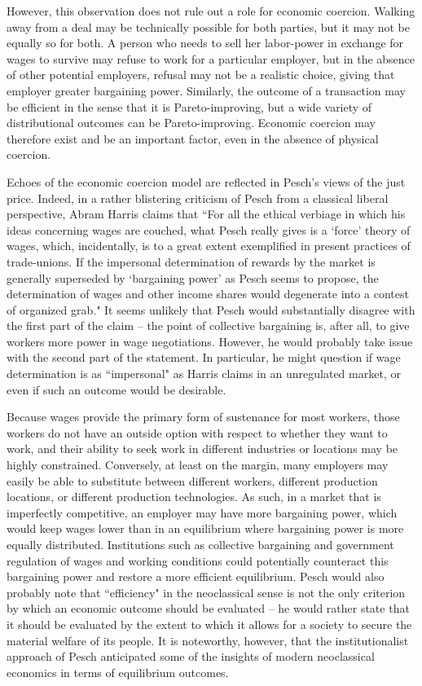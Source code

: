 \documentclass{article}
\begin{document}
However, this observation does not rule out a role for economic coercion.  Walking away from a deal may be technically possible for both parties, but it may not be equally so for both.  A person who needs to sell her labor-power in exchange for wages to survive may refuse to work for a particular employer, but in the absence of other potential employers, refusal may not be a realistic choice, giving that employer greater bargaining power.  Similarly, the outcome of a transaction may be efficient in the sense that it is Pareto-improving, but a wide variety of distributional outcomes can be Pareto-improving.  Economic coercion may therefore exist and be an important factor, even in the absence of physical coercion.\medskip

Echoes of the economic coercion model are reflected in Pesch’s views of the just price.  Indeed, in a rather blistering criticism of Pesch from a classical liberal perspective, Abram Harris claims that ``For all the ethical verbiage in which his ideas concerning wages are couched, what Pesch really gives is a ‘force’ theory of wages, which, incidentally, is to a great extent exemplified in present practices of trade-unions.  If the impersonal determination of rewards by the market is generally superseded by ‘bargaining power’ as Pesch seems to propose, the determination of wages and other income shares would degenerate into a contest of organized grab." \citep[pp. 46-47]{harris1946}  It seems unlikely that Pesch would substantially disagree with the first part of the claim – the point of collective bargaining is, after all, to give workers more power in wage negotiations.  However, he would probably take issue with the second part of the statement.  In particular, he might question if wage determination is as ``impersonal" as Harris claims in an unregulated market, or even if such an outcome would be desirable.\medskip

Because wages provide the primary form of sustenance for most workers, those workers do not have an outside option with respect to whether they want to work, and their ability to seek work in different industries or locations may be highly constrained.  Conversely, at least on the margin, many employers may easily be able to substitute between different workers, different production locations, or different production technologies.  As such, in a market that is imperfectly competitive, an employer may have more bargaining power, which would keep wages lower than in an equilibrium where bargaining power is more equally distributed.  Institutions such as collective bargaining and government regulation of wages and working conditions could potentially counteract this bargaining power and restore a more efficient equilibrium.  Pesch would also probably note that ``efficiency" in the neoclassical sense is not the only criterion by which an economic outcome should be evaluated – he would rather state that it should be evaluated by the extent to which it allows for a society to secure the material welfare of its people.  It is noteworthy, however, that the institutionalist approach of Pesch anticipated some of the insights of modern neoclassical economics in terms of equilibrium outcomes.\medskip
\end{document}

